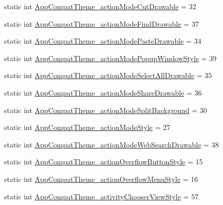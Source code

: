 \begin{DoxyCompactItemize}
\item 
static int \hyperlink{classandroid_1_1support_1_1v7_1_1mediarouter_1_1R_1_1styleable_add6ca7722d70aa9fa921307092178367}{App\+Compat\+Theme\+\_\+action\+Mode\+Cut\+Drawable} = 32
\item 
static int \hyperlink{classandroid_1_1support_1_1v7_1_1mediarouter_1_1R_1_1styleable_a247a1523628d74f978947c8ee5b64026}{App\+Compat\+Theme\+\_\+action\+Mode\+Find\+Drawable} = 37
\item 
static int \hyperlink{classandroid_1_1support_1_1v7_1_1mediarouter_1_1R_1_1styleable_a1c9dba2509b8423490c34fd739e56e38}{App\+Compat\+Theme\+\_\+action\+Mode\+Paste\+Drawable} = 34
\item 
static int \hyperlink{classandroid_1_1support_1_1v7_1_1mediarouter_1_1R_1_1styleable_a5f3bae33936a9476e7e6a9dab290157f}{App\+Compat\+Theme\+\_\+action\+Mode\+Popup\+Window\+Style} = 39
\item 
static int \hyperlink{classandroid_1_1support_1_1v7_1_1mediarouter_1_1R_1_1styleable_a8e509977527febb24aa3df6255a62133}{App\+Compat\+Theme\+\_\+action\+Mode\+Select\+All\+Drawable} = 35
\item 
static int \hyperlink{classandroid_1_1support_1_1v7_1_1mediarouter_1_1R_1_1styleable_a305e4c84830a00514e165895e02e495b}{App\+Compat\+Theme\+\_\+action\+Mode\+Share\+Drawable} = 36
\item 
static int \hyperlink{classandroid_1_1support_1_1v7_1_1mediarouter_1_1R_1_1styleable_abc934a2d6ba38ecd031b953990596657}{App\+Compat\+Theme\+\_\+action\+Mode\+Split\+Background} = 30
\item 
static int \hyperlink{classandroid_1_1support_1_1v7_1_1mediarouter_1_1R_1_1styleable_aa2e34e25fe2d921d8ba076badd8da157}{App\+Compat\+Theme\+\_\+action\+Mode\+Style} = 27
\item 
static int \hyperlink{classandroid_1_1support_1_1v7_1_1mediarouter_1_1R_1_1styleable_a8750fdc15dc71047eb1dcd4f7bb5479e}{App\+Compat\+Theme\+\_\+action\+Mode\+Web\+Search\+Drawable} = 38
\item 
static int \hyperlink{classandroid_1_1support_1_1v7_1_1mediarouter_1_1R_1_1styleable_ac665d51a11a8dd32d6ce85955504ca2a}{App\+Compat\+Theme\+\_\+action\+Overflow\+Button\+Style} = 15
\item 
static int \hyperlink{classandroid_1_1support_1_1v7_1_1mediarouter_1_1R_1_1styleable_a64e7ff0b0b48c4a78c68ba5fec7fe779}{App\+Compat\+Theme\+\_\+action\+Overflow\+Menu\+Style} = 16
\item 
static int \hyperlink{classandroid_1_1support_1_1v7_1_1mediarouter_1_1R_1_1styleable_ac7174a04e7b274cbb6fb345ebb1c514b}{App\+Compat\+Theme\+\_\+activity\+Chooser\+View\+Style} = 57

\end{DoxyCompactItemize}
